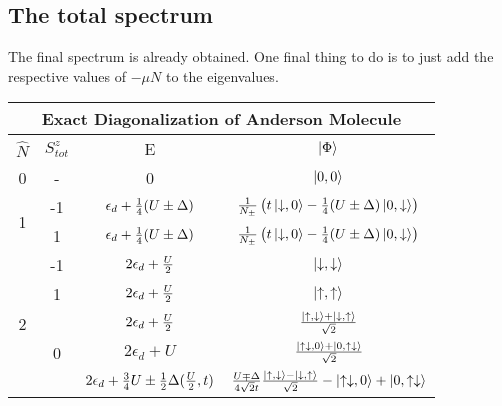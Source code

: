 \documentclass[12pt]{article}
\begin{document}
\subsection{The total spectrum}
The final spectrum is already obtained. One final thing to do is to just add the respective values of \(-\mu N\) to the eigenvalues.
\begin{center}
\begin{tabular}{@{}cccc@{}}
\toprule
\multicolumn{4}{c}{\bf{Exact Diagonalization of Anderson Molecule}} \\
\toprule
\(\hat{N}\) & \(S_{tot}^z\) & E & \(\ket{\Phi}\)\\
\toprule
0 & - & 0 & \(\ket{0,0}\) \\ \toprule
\multirow{2}{*}{1} & -1 & \(\epsilon_d + \frac{1}{4}(U\pm\Delta)\)  & \(\frac{1}{N_\pm}\left({t\ket{\downarrow,0}-\frac{1}{4}(U\pm\Delta)\ket{0,\downarrow}}\right)\) \\

 \cmidrule(l){2-4}

& 1 & \(\epsilon_d + \frac{1}{4}(U\pm\Delta)\)  & \(\frac{1}{N_\pm}\left({t\ket{\downarrow,0}-\frac{1}{4}(U\pm\Delta)\ket{0,\downarrow}}\right)\) \\
 \toprule

\multirow{6}{*}{2}                     & -1                  & \(2\epsilon_d+\frac{U}{2}\)   & \(\ket{\downarrow,\downarrow}\)  \\
 \cmidrule(l){2-4} 
                                       & 1                   & \(2\epsilon_d+\frac{U}{2}\)   & \(\ket{\uparrow,\uparrow}\) \\
                                       \cmidrule(l){2-4} 
                                       & \multirow{3}{*}{0}  & \(2\epsilon_d+\frac{U}{2}\)   & \(\frac{\ket{\uparrow,\downarrow}+\ket{\downarrow,\uparrow}}{\sqrt{2}}\)  \\
                                        \cmidrule(l){3-4} 

                                       &                     & \(2\epsilon_d+U\)  & \(\frac{\ket{\uparrow\downarrow,0}+\ket{0,\uparrow\downarrow}}{\sqrt{2}}\)  \\
                                        \cmidrule(l){3-4} 

                                       &                     & \(2\epsilon_d+\frac{3}{4}U\pm\frac{1}{2}\Delta(\frac{U}{2},t)\)    & \(\frac{U\mp\Delta}{4\sqrt{2}t}\frac{\ket{\uparrow,\downarrow} - \ket{\downarrow,\uparrow}}{\sqrt 2}-\ket{\uparrow\downarrow,0} + \ket{0,\uparrow\downarrow}\)  \\
                                     

\end{tabular}
\end{center}
\end{document}
